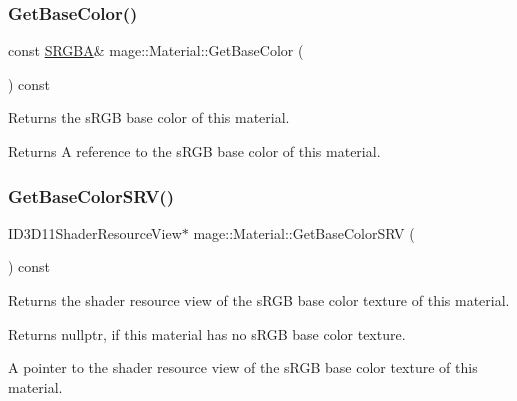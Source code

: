 \subsubsection{\texorpdfstring{Get\+Base\+Color()}{GetBaseColor()}\hspace{0.1cm}{\footnotesize\ttfamily [2/2]}}
{\footnotesize\ttfamily const \hyperlink{structmage_1_1_s_r_g_b_a}{S\+R\+G\+BA}\& mage\+::\+Material\+::\+Get\+Base\+Color (\begin{DoxyParamCaption}{ }\end{DoxyParamCaption}) const\hspace{0.3cm}{\ttfamily [noexcept]}}

Returns the s\+R\+GB base color of this material.

\begin{DoxyReturn}{Returns}
A reference to the s\+R\+GB base color of this material. 
\end{DoxyReturn}
\hypertarget{classmage_1_1_material_aef6ae5f87347d9e4bf798079aa906dd3}{}\label{classmage_1_1_material_aef6ae5f87347d9e4bf798079aa906dd3} 
\subsubsection{\texorpdfstring{Get\+Base\+Color\+S\+R\+V()}{GetBaseColorSRV()}}
{\footnotesize\ttfamily I\+D3\+D11\+Shader\+Resource\+View$\ast$ mage\+::\+Material\+::\+Get\+Base\+Color\+S\+RV (\begin{DoxyParamCaption}{ }\end{DoxyParamCaption}) const\hspace{0.3cm}{\ttfamily [noexcept]}}

Returns the shader resource view of the s\+R\+GB base color texture of this material.

\begin{DoxyReturn}{Returns}
{\ttfamily nullptr}, if this material has no s\+R\+GB base color texture. 

A pointer to the shader resource view of the s\+R\+GB base color texture of this material. 
\end{DoxyReturn}
\hypertarget{classmage_1_1_material_a76b84c808a281589d60ebbe2e2932c01}{}\label{classmage_1_1_material_a76b84c808a281589d60ebbe2e2932c01} 
